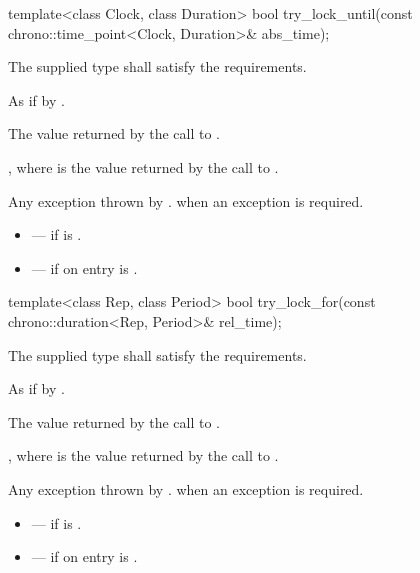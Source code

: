%
\begin{itemdecl}
template<class Clock, class Duration>
  bool try_lock_until(const chrono::time_point<Clock, Duration>& abs_time);
\end{itemdecl}

\begin{itemdescr}
\pnum
\requires The supplied  type shall satisfy the 
requirements.

\pnum
\effects As if by .

\pnum
\returns The value returned by the call to .

\pnum
\postconditions {}, where  is the value returned by
the call to .

\pnum
\throws Any exception thrown by .  when an
exception is required.

\pnum
\errors
\begin{itemize}
\item {} --- if  is .
\item {} --- if on entry  is
.
\end{itemize}
\end{itemdescr}

%
\begin{itemdecl}
template<class Rep, class Period>
  bool try_lock_for(const chrono::duration<Rep, Period>& rel_time);
\end{itemdecl}

\begin{itemdescr}
\pnum
\requires The supplied  type shall satisfy the  requirements.

\pnum
\effects As if by .

\pnum
\returns The value returned by the call to .

\pnum
\postconditions {}, where  is the value returned by the call to .

\pnum
\throws Any exception thrown by .  when an
exception is required.

\pnum
\errors
\begin{itemize}
\item {} --- if  is .
\item {} --- if on entry  is
.
\end{itemize}
\end{itemdescr}

